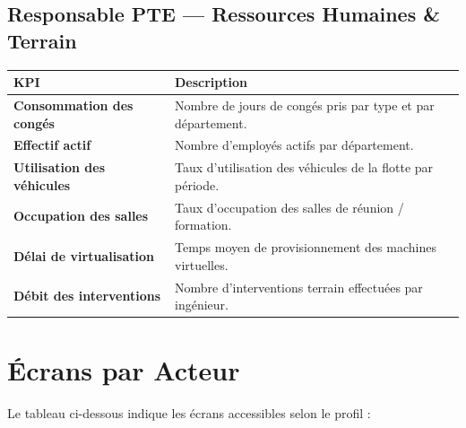 \documentclass[a4paper,12pt]{article}
\begin{document}
\subsection{Responsable PTE — Ressources Humaines \& Terrain}

\begin{longtable}{>{\bfseries}p{5cm} p{9.5cm}}
\toprule
KPI & Description \\
\midrule
\endhead
Consommation des congés       & Nombre de jours de congés pris par type et par département. \\
Effectif actif                & Nombre d'employés actifs par département. \\
Utilisation des véhicules     & Taux d'utilisation des véhicules de la flotte par période. \\
Occupation des salles         & Taux d'occupation des salles de réunion / formation. \\
Délai de virtualisation       & Temps moyen de provisionnement des machines virtuelles. \\
Débit des interventions       & Nombre d'interventions terrain effectuées par ingénieur. \\
\bottomrule
\end{longtable}

\section{Écrans par Acteur}

Le tableau ci-dessous indique les écrans accessibles selon le profil :
\end{document}
